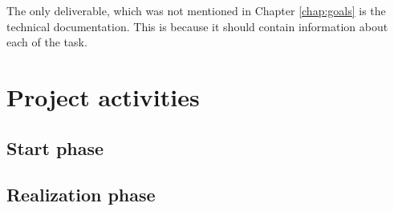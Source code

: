 \documentclass{report}
\begin{document}
	The only deliverable, which was not mentioned in Chapter \ref{chap:goals} is the technical documentation. This is because it should contain information about each of the task.
		
	
	\chapter{Project activities}
	
	
	\section{Start phase}
	
	\section{Realization phase}
	
	
\end{document}
